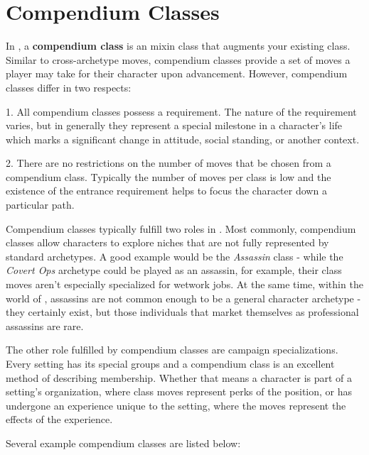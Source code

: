 \documentclass[oneside,10pt]{article}
\begin{document}
\section{Compendium Classes}
\begin{multicols}{2}

In \SW{}, a \textbf{compendium class} is an mixin class that augments your existing class. Similar to cross-archetype moves, compendium classes provide a set of moves a player may take for their character upon advancement. However, compendium classes differ in two respects:

\begin{adjustwidth*}{.5cm}{.5cm}

1. All compendium classes possess a requirement. The nature of the requirement varies, but in generally they represent a special milestone in a character's life which marks a significant change in attitude, social standing, or another context.

2. There are no restrictions on the number of moves that be chosen from a compendium class. Typically the number of moves per class is low and the existence of the entrance requirement helps to focus the character down a particular path.

\end{adjustwidth*}

Compendium classes typically fulfill two roles in \SW{}. Most commonly, compendium classes allow characters to explore niches that are not fully represented by standard archetypes. A good example would be the \textit{Assassin} class - while the \textit{Covert Ops} archetype could be played as an assassin, for example, their class moves aren't especially specialized for wetwork jobs. At the same time, within the world of \SW{}, assassins are not common enough to be a general character archetype -  they certainly exist, but those individuals that market themselves as professional assassins are rare.

The other role fulfilled by compendium classes are campaign specializations. Every setting has its special groups and a compendium class is an excellent method of describing membership. Whether that means a character is part of a setting's organization, where class moves represent perks of the position, or has undergone an experience unique to the setting, where the moves represent the effects of the experience.

Several example compendium classes are listed below:

\end{multicols}
\end{document}
